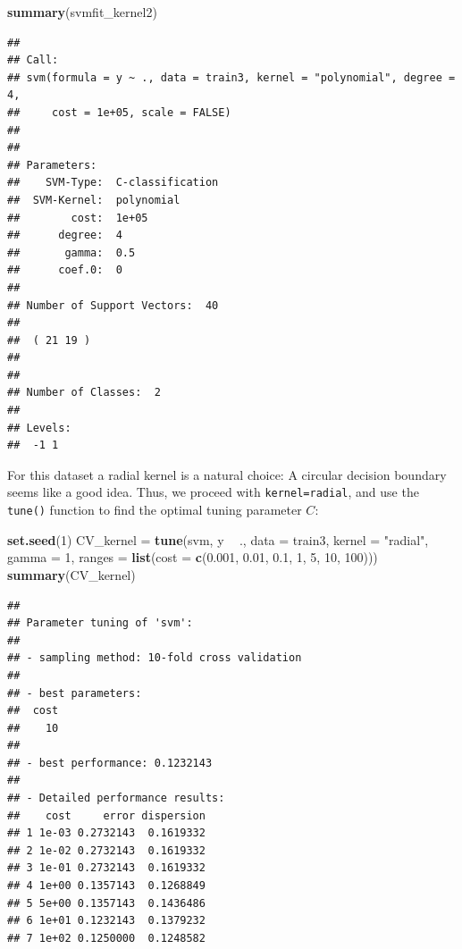 \documentclass[ignorenonframetext,]{beamer}
\newenvironment{Shaded}{\begin{snugshade}}{\end{snugshade}}
\newcommand{\KeywordTok}[1]{\textcolor[rgb]{0.13,0.29,0.53}{\textbf{#1}}}
\newcommand{\DataTypeTok}[1]{\textcolor[rgb]{0.13,0.29,0.53}{#1}}
\newcommand{\DecValTok}[1]{\textcolor[rgb]{0.00,0.00,0.81}{#1}}
\newcommand{\FloatTok}[1]{\textcolor[rgb]{0.00,0.00,0.81}{#1}}
\newcommand{\StringTok}[1]{\textcolor[rgb]{0.31,0.60,0.02}{#1}}
\newcommand{\OperatorTok}[1]{\textcolor[rgb]{0.81,0.36,0.00}{\textbf{#1}}}
\newcommand{\NormalTok}[1]{#1}
\begin{document}
\begin{frame}[fragile]

\begin{Shaded}
\begin{Highlighting}[]
\KeywordTok{summary}\NormalTok{(svmfit_kernel2)}
\end{Highlighting}
\end{Shaded}

\begin{verbatim}
## 
## Call:
## svm(formula = y ~ ., data = train3, kernel = "polynomial", degree = 4, 
##     cost = 1e+05, scale = FALSE)
## 
## 
## Parameters:
##    SVM-Type:  C-classification 
##  SVM-Kernel:  polynomial 
##        cost:  1e+05 
##      degree:  4 
##       gamma:  0.5 
##      coef.0:  0 
## 
## Number of Support Vectors:  40
## 
##  ( 21 19 )
## 
## 
## Number of Classes:  2 
## 
## Levels: 
##  -1 1
\end{verbatim}

\normalsize

\end{frame}

\begin{frame}[fragile]

For this dataset a radial kernel is a natural choice: A circular
decision boundary seems like a good idea. Thus, we proceed with
\texttt{kernel=\textquotesingle{}radial\textquotesingle{}}, and use the
\texttt{tune()} function to find the optimal tuning parameter \(C\):

\footnotesize

\begin{Shaded}
\begin{Highlighting}[]
\KeywordTok{set.seed}\NormalTok{(}\DecValTok{1}\NormalTok{)}
\NormalTok{CV_kernel =}\StringTok{ }\KeywordTok{tune}\NormalTok{(svm, y }\OperatorTok{~}\StringTok{ }\NormalTok{., }\DataTypeTok{data =}\NormalTok{ train3, }\DataTypeTok{kernel =} \StringTok{"radial"}\NormalTok{, }\DataTypeTok{gamma =} \DecValTok{1}\NormalTok{, }
    \DataTypeTok{ranges =} \KeywordTok{list}\NormalTok{(}\DataTypeTok{cost =} \KeywordTok{c}\NormalTok{(}\FloatTok{0.001}\NormalTok{, }\FloatTok{0.01}\NormalTok{, }\FloatTok{0.1}\NormalTok{, }\DecValTok{1}\NormalTok{, }\DecValTok{5}\NormalTok{, }\DecValTok{10}\NormalTok{, }\DecValTok{100}\NormalTok{)))}
\KeywordTok{summary}\NormalTok{(CV_kernel)}
\end{Highlighting}
\end{Shaded}

\begin{verbatim}
## 
## Parameter tuning of 'svm':
## 
## - sampling method: 10-fold cross validation 
## 
## - best parameters:
##  cost
##    10
## 
## - best performance: 0.1232143 
## 
## - Detailed performance results:
##    cost     error dispersion
## 1 1e-03 0.2732143  0.1619332
## 2 1e-02 0.2732143  0.1619332
## 3 1e-01 0.2732143  0.1619332
## 4 1e+00 0.1357143  0.1268849
## 5 5e+00 0.1357143  0.1436486
## 6 1e+01 0.1232143  0.1379232
## 7 1e+02 0.1250000  0.1248582
\end{verbatim}

\normalsize

\end{frame}
\end{document}
